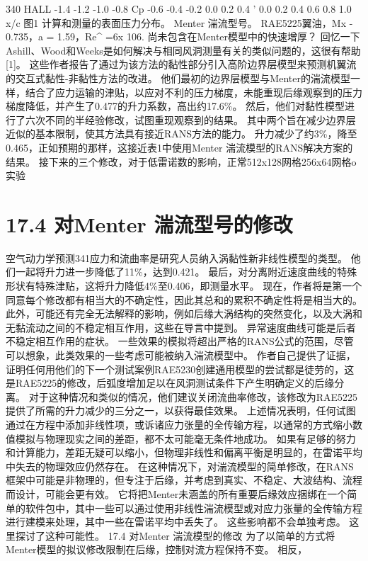 \documentclass[UTF8,11pt,a4paper,openany,fontset=fandol]{ctexbook}
\begin{document}
340 HALL -1.4 -1.2 -1.0 -0.8 Cp -0.6 -0.4 -0.2 0.0 0.2 0.4 ' 0.0 0.2 0.4 0.6 0.8 1.0 x/c 图1 计算和测量的表面压力分布。 Menter 湍流型号。 RAE5225翼油，Mx - 0.735，a = 1.59，Re\textasciicircum{} =6x 106. 尚未包含在Menter模型中的快速增厚？ 回忆一下Ashill、Wood和Weeks是如何解决与相同风洞测量有关的类似问题的，这很有帮助[1]。 这些作者报告了通过为该方法的黏性部分引入高阶边界层模型来预测机翼流的交互式黏性-非黏性方法的改进。 他们最初的边界层模型与Menter的湍流模型一样，结合了应力运输的津贴，以应对不利的压力梯度，未能重现后缘观察到的压力梯度降低，并产生了0.477的升力系数，高出约17.6\%。 然后，他们对黏性模型进行了六次不同的半经验修改，试图重现观察到的结果。 其中两个旨在减少边界层近似的基本限制，使其方法具有接近RANS方法的能力。 升力减少了约3\%，降至0.465，正如预期的那样，这接近表1中使用Menter 湍流模型的RANS解决方案的结果。 接下来的三个修改，对于低雷诺数的影响，正常512x128网格256x64网格o实验

\section{17.4 对Menter 湍流型号的修改}
空气动力学预测341应力和流曲率是研究人员纳入涡黏性新非线性模型的类型。 他们一起将升力进一步降低了11\%，达到0.421。 最后，对分离附近速度曲线的特殊形状有特殊津贴，这将升力降低4\%至0.406，即测量水平。 现在，作者将是第一个同意每个修改都有相当大的不确定性，因此其总和的累积不确定性将是相当大的。 此外，可能还有完全无法解释的影响，例如后缘大涡结构的突然变化，以及大涡和无黏流动之间的不稳定相互作用，这些在导言中提到。 异常速度曲线可能是后者不稳定相互作用的症状。 一些效果的模拟将超出严格的RANS公式的范围，尽管可以想象，此类效果的一些考虑可能被纳入湍流模型中。 作者自己提供了证据，证明任何用他们的下一个测试案例RAE5230创建通用模型的尝试都是徒劳的，这是RAE5225的修改，后弧度增加足以在风洞测试条件下产生明确定义的后缘分离。 对于这种情况和类似的情况，他们建议关闭流曲率修改，该修改为RAE5225提供了所需的升力减少的三分之一，以获得最佳效果。 上述情况表明，任何试图通过在方程中添加非线性项，或诉诸应力张量的全传输方程，以通常的方式缩小数值模拟与物理现实之间的差距，都不太可能毫无条件地成功。 如果有足够的努力和计算能力，差距无疑可以缩小，但物理非线性和偏离平衡是明显的，在雷诺平均中失去的物理效应仍然存在。 在这种情况下，对湍流模型的简单修改，在RANS框架中可能是非物理的，但专注于后缘，并考虑到真实、不稳定、大波结构、流程而设计，可能会更有效。 它将把Menter未涵盖的所有重要后缘效应捆绑在一个简单的软件包中，其中一些可以通过使用非线性湍流模型或对应力张量的全传输方程进行建模来处理，其中一些在雷诺平均中丢失了。 这些影响都不会单独考虑。 这里探讨了这种可能性。 17.4 对Menter 湍流模型的修改 为了以简单的方式将Menter模型的拟议修改限制在后缘，控制对流方程保持不变。 相反，
\end{document}
